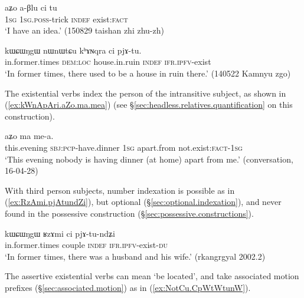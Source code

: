 \begin{exe}
\ex \label{ex:aBlu.ci.tu}
\gll   aʑo a-βlu ci tu \\
\textsc{1sg} \textsc{1sg}.\textsc{poss}-trick \textsc{indef} exist:\textsc{fact} \\
\glt `I have an idea.' (150829 taishan zhi zhu-zh)
\end{exe}

\begin{exe}
\ex \label{ex:khANqra.ci.pjAtu}
\gll   kɯɕɯŋgɯ nɯnɯtɕu kʰɤɴqra ci pjɤ-tu. \\
in.former.times \textsc{dem}:\textsc{loc} house.in.ruin \textsc{indef} \textsc{ifr}.\textsc{ipfv}-exist \\
\glt `In former times, there used to be a house in ruin there.' (140522 Kamnyu zgo)
\end{exe}

The existential verbs index the person of the intransitive subject, as shown in (\ref{ex:kWnApAri.aZo.ma.mea}) (see §\ref{sec:headless.relatives.quantification} on this construction).

\begin{exe}
\ex \label{ex:kWnApAri.aZo.ma.mea}
 aʑo ma me-a. \\
this.evening \textsc{sbj}:\textsc{pcp}-have.dinner \textsc{1sg} apart.from not.exist:\textsc{fact}-\textsc{1sg} \\
\glt `This evening nobody is having dinner (at home) apart from me.'   (conversation, 16-04-28)
\end{exe}

With third person subjects, number indexation is possible as in (\ref{ex:RzAmi.pjAtundZi}), but optional  (§\ref{sec:optional.indexation}), and never found in the possessive construction (§\ref{sec:possessive.constructions}).

\begin{exe}
\ex \label{ex:RzAmi.pjAtundZi}
\gll  kɯɕɯŋgɯ ʁzɤmi ci pjɤ-tu-ndʑi \\
in.former.times couple \textsc{indef} \textsc{ifr}.\textsc{ipfv}-exist-\textsc{du} \\
\glt `In former times, there was a husband and his wife.' (rkangrgyal 2002.2)
 \end{exe}
 
The assertive existential verbs can mean `be located', and take associated motion prefixes (§\ref{sec:associated.motion}) as in (\ref{ex:NotCu.CpWtWtunW}).

